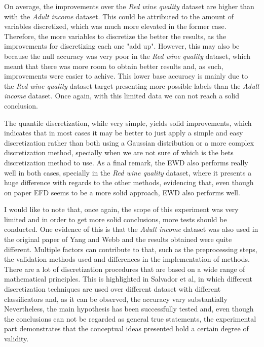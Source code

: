 \documentclass{article}
\begin{document}
On average, the improvements over the \emph{Red wine quality} dataset are higher than with the \emph{Adult income} dataset. This could be attributed to the amount of variables discretized, which was much more elevated in the former case. Therefore, the more variables to discretize the better the results, as the improvements for discretizing each one "add up". However, this may also be because the null accuracy was very poor in the \emph{Red wine quality} dataset, which meant that there was more room to obtain better results and, as such, improvements were easier to achive. This lower base accuracy is mainly due to the \emph{Red wine quality} dataset target presenting more possible labels than the \emph{Adult income} dataset. Once again, with this limited data we can not reach a solid conclusion.

The quantile discretization, while very simple, yields solid improvements, which indicates that in most cases it may be better to just apply a simple and easy discretization rather than both using a Gaussian distribution or a more complex discretization method, specially when we are not sure of which is the bets discretization method to use. As a final remark, the EWD also performs really well in both cases, specially in the \emph{Red wine quality} dataset, where it presents a huge difference with regards to the other methods, evidencing that, even though on paper EFD seems to be a more solid approach, EWD also performs well.

I would like to note that, once again, the scope of this experiment was very limited and in order to get more solid conclusions, more tests should be conducted. One evidence of this is that the \emph{Adult income} dataset was also used in the original paper of Yang and Webb and the results obtained were quite different. Multiple factors can contribute to that, such as the preprocessing steps, the validation methods used and differences in the implementation of methods. There are a lot of discretization procedures that are based on a wide range of mathematical principles. This is highlighted in Salvador et al\cite{Salvador13}, in which different discretization techniques are used over different dataset with different classificators and, as it can be observed, the accuracy vary substantially Nevertheless, the main hypothesis has been successfully tested and, even though the conclusions can not be regarded as general true statements, the experimental part demonstrates that the conceptual ideas presented hold a certain degree of validity.

\printbibliography
\end{document}
